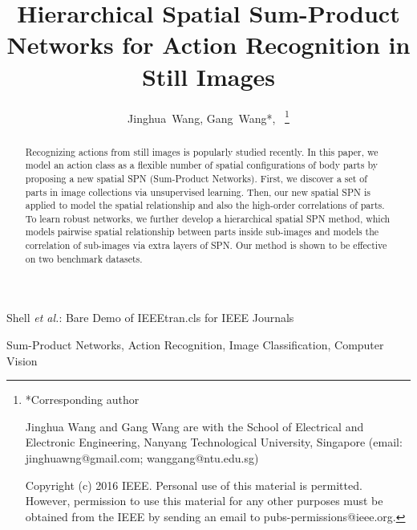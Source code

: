 \documentclass[journal]{IEEEtran}
\begin{document}
\title{Hierarchical Spatial Sum-Product Networks for Action Recognition in Still Images}

\author{Jinghua~Wang, Gang~Wang*,~
	\thanks{*Corresponding author


		Jinghua Wang and Gang Wang are with the School of Electrical and Electronic Engineering, Nanyang Technological University, Singapore (email: jinghuawng@gmail.com; wanggang@ntu.edu.sg)

		Copyright (c) 2016 IEEE. Personal use of this material is permitted.
		However, permission to use this material for any other purposes must be obtained from the IEEE by sending an email to pubs-permissions@ieee.org.
	}%
}



%
{Shell \MakeLowercase{\textit{et al.}}: Bare Demo of IEEEtran.cls for IEEE Journals}














\maketitle

\begin{abstract}
Recognizing actions from still images is popularly studied recently. In this paper, we model an action class as a flexible number of spatial configurations of body parts by proposing a new spatial SPN (Sum-Product Networks). First, we discover a set of parts in image collections via unsupervised learning. Then, our new spatial SPN is applied to model the spatial relationship and also the high-order correlations of parts. To learn robust networks, we further develop a hierarchical spatial SPN method, which models pairwise spatial relationship between parts inside sub-images and models the correlation of sub-images via extra layers of SPN. Our method is shown to be effective on two benchmark datasets.

\end{abstract}

\begin{IEEEkeywords}
Sum-Product Networks, Action Recognition, Image Classification, Computer Vision
\end{IEEEkeywords}
\end{document}
